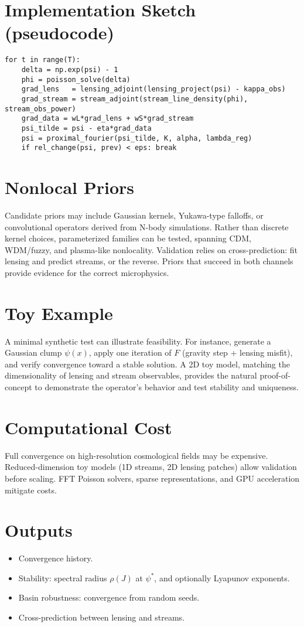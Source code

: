 \documentclass[11pt]{article}
\begin{document}
\section{Implementation Sketch (pseudocode)}
\begin{verbatim}
for t in range(T):
    delta = np.exp(psi) - 1
    phi = poisson_solve(delta)
    grad_lens   = lensing_adjoint(lensing_project(psi) - kappa_obs)
    grad_stream = stream_adjoint(stream_line_density(phi), stream_obs_power)
    grad_data = wL*grad_lens + wS*grad_stream
    psi_tilde = psi - eta*grad_data
    psi = proximal_fourier(psi_tilde, K, alpha, lambda_reg)
    if rel_change(psi, prev) < eps: break
\end{verbatim}

\section{Nonlocal Priors}
Candidate priors may include Gaussian kernels, Yukawa-type falloffs, or convolutional operators
derived from N-body simulations. Rather than discrete kernel choices, parameterized families can be tested,
spanning CDM, WDM/fuzzy, and plasma-like nonlocality.
Validation relies on cross-prediction: fit lensing and predict streams, or the reverse.
Priors that succeed in both channels provide evidence for the correct microphysics.

\section{Toy Example}
A minimal synthetic test can illustrate feasibility. For instance,
generate a Gaussian clump $\psi(x)$, apply one iteration of $F$
(gravity step + lensing misfit), and verify convergence toward a stable solution.
A 2D toy model, matching the dimensionality of lensing and stream observables, provides the natural proof-of-concept to demonstrate the operator’s behavior and test stability and uniqueness.

\section{Computational Cost}
Full convergence on high-resolution cosmological fields may be expensive.
Reduced-dimension toy models (1D streams, 2D lensing patches)
allow validation before scaling. FFT Poisson solvers, sparse representations,
and GPU acceleration mitigate costs.

\section{Outputs}
\begin{itemize}
\item Convergence history.
\item Stability: spectral radius $\rho(J)$ at $\psi^\ast$, and optionally Lyapunov exponents.
\item Basin robustness: convergence from random seeds.
\item Cross-prediction between lensing and streams.
\end{itemize}
\end{document}
